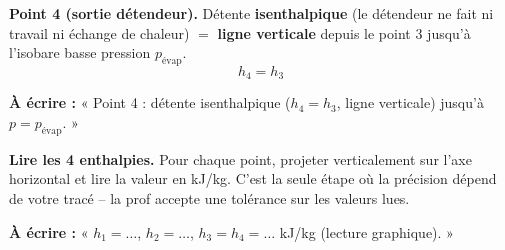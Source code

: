 \documentclass[11pt,a4paper]{article}
\begin{document}
\begin{step}
\textbf{Point 4 (sortie détendeur).} Détente \textbf{isenthalpique} (le détendeur ne fait ni travail
ni échange de chaleur) $=$ \textbf{ligne verticale} depuis le point 3 jusqu'à l'isobare basse
pression $p_{\text{évap}}$.
\[ h_4 = h_3 \]
\end{step}
\begin{ecrire}
\textbf{À écrire :} « Point 4 : détente isenthalpique ($h_4=h_3$, ligne verticale) jusqu'à
$p=p_{\text{évap}}$. »
\end{ecrire}

\begin{step}
\textbf{Lire les 4 enthalpies.} Pour chaque point, projeter verticalement sur l'axe horizontal
et lire la valeur en kJ/kg. C'est la seule étape où la précision dépend de votre tracé -- la prof
accepte une tolérance sur les valeurs lues.
\end{step}
\begin{ecrire}
\textbf{À écrire :} « $h_1=\ldots$, $h_2=\ldots$, $h_3=h_4=\ldots$ kJ/kg (lecture graphique). »
\end{ecrire}
\end{document}
